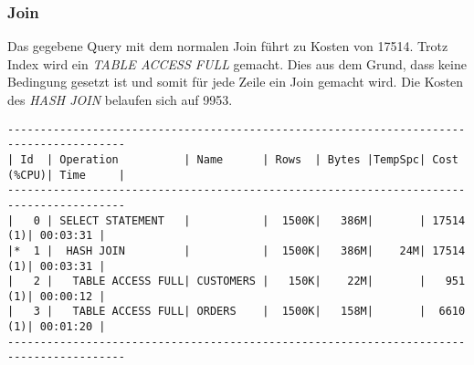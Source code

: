 \documentclass[11pt,a4paper,parskip=half]{scrartcl}
\begin{document}
\subsubsection{Join}
Das gegebene Query mit dem normalen Join führt zu Kosten von 17514. Trotz Index wird ein \emph{TABLE ACCESS FULL} gemacht. Dies aus dem Grund, dass keine Bedingung gesetzt ist und somit für jede Zeile ein Join gemacht wird. Die Kosten des \emph{HASH JOIN}  belaufen sich auf 9953.
\begin{lstlisting}
----------------------------------------------------------------------------------------                                                                                                                                                                                                                     
| Id  | Operation          | Name      | Rows  | Bytes |TempSpc| Cost (%CPU)| Time     |                                                                                                                                                                                                                     
----------------------------------------------------------------------------------------                                                                                                                                                                                                                     
|   0 | SELECT STATEMENT   |           |  1500K|   386M|       | 17514   (1)| 00:03:31 |                                                                                                                                                                                                                     
|*  1 |  HASH JOIN         |           |  1500K|   386M|    24M| 17514   (1)| 00:03:31 |                                                                                                                                                                                                                     
|   2 |   TABLE ACCESS FULL| CUSTOMERS |   150K|    22M|       |   951   (1)| 00:00:12 |                                                                                                                                                                                                                     
|   3 |   TABLE ACCESS FULL| ORDERS    |  1500K|   158M|       |  6610   (1)| 00:01:20 |                                                                                                                                                                                                                     
----------------------------------------------------------------------------------------                                                                                                                                                                                                                     
                                                                                                                                                                                                                                                                                                             

\end{lstlisting}
\end{document}
